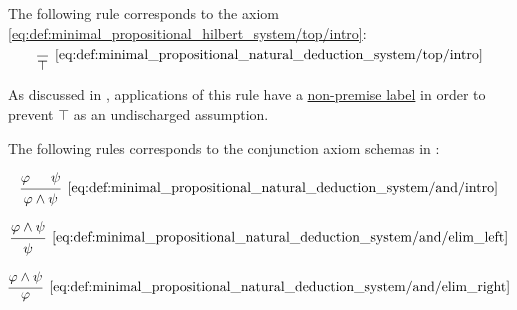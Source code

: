 \begin{definition}
\begin{thmenum}
     The following rule corresponds to the axiom \eqref{eq:def:minimal_propositional_hilbert_system/top/intro}:
    \begin{equation*}\taglabel[\( \top^+ \)]{eq:def:minimal_propositional_natural_deduction_system/top/intro}
      \begin{prooftree}
        \infer0[\ref{eq:def:minimal_propositional_natural_deduction_system/top/intro}]{ \top }
      \end{prooftree}
    \end{equation*}

    As discussed in , applications of this rule have a \hyperref[def:proof_tree/premises]{non-premise label} in order to prevent \( \top \) as an undischarged assumption.

     The following rules corresponds to the conjunction axiom schemas in :

    \begin{minipage}{0.3\textwidth}
      \begin{equation*}\taglabel[\( \wedge^+ \)]{eq:def:minimal_propositional_natural_deduction_system/and/intro}
        \begin{prooftree}
          \hypo{ \varphi }
          \hypo{ \psi }
          \infer2[\ref{eq:def:minimal_propositional_natural_deduction_system/and/intro}]{ \varphi \wedge \psi }
        \end{prooftree}
      \end{equation*}
    \end{minipage}
    \hfill
    \begin{minipage}{0.3\textwidth}
      \begin{equation*}\taglabel[\( \wedge^{-_L} \)]{eq:def:minimal_propositional_natural_deduction_system/and/elim_left}
        \begin{prooftree}
          \hypo{ \varphi \wedge \psi }
          \infer1[\ref{eq:def:minimal_propositional_natural_deduction_system/and/elim_left}]{ \psi }
        \end{prooftree}
      \end{equation*}
    \end{minipage}
    \hfill
    \begin{minipage}{0.3\textwidth}
      \begin{equation*}\taglabel[\( \wedge^{-_R} \)]{eq:def:minimal_propositional_natural_deduction_system/and/elim_right}
        \begin{prooftree}
          \hypo{ \varphi \wedge \psi }
          \infer1[\ref{eq:def:minimal_propositional_natural_deduction_system/and/elim_right}]{ \varphi }
        \end{prooftree}
      \end{equation*}
    \end{minipage}


\end{thmenum}
\end{definition}
